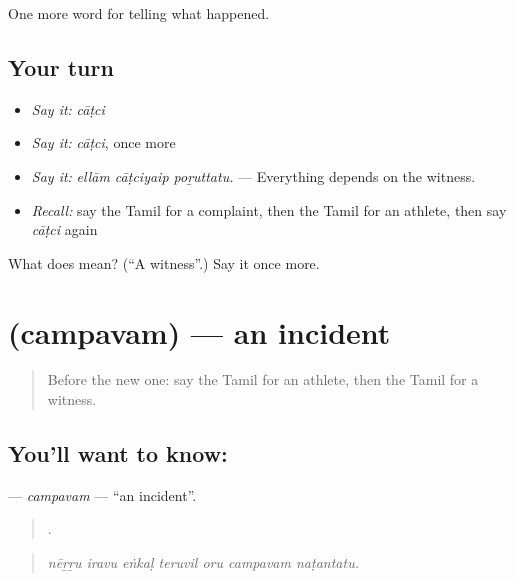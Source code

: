 \begin{grammarlens}[title={What you've built}]
One more word for telling what happened.
\end{grammarlens}

\subsection*{Your turn}
\begin{itemize}
\raggedright
  \item \emph{Say it:} \emph{cāṭci}
  \item \emph{Say it:} \emph{cāṭci}, once more
  \item \emph{Say it:} \emph{ellām cāṭciyaip poṟuttatu.} — Everything depends on the witness.
  \item \emph{Recall:} say the Tamil for a complaint, then the Tamil for an athlete, then say \emph{cāṭci} again
\end{itemize}

\begin{tcolorbox}[breakable,colback=teal!4,colframe=teal!35!black,title={Before you move on}]
What does  mean? (\textquotedblleft{}A witness\textquotedblright{}.) Say it once more.
\end{tcolorbox}
\section[\texorpdfstring{\ta{சம்பவம்} (campavam)}{சம்பவம் (campavam)}]{ (campavam) — an incident}

\label{lesson:TA-C294-campavam}



\begin{quote}
Before the new one: say the Tamil for an athlete, then the Tamil for a witness.
\end{quote}

\subsection*{You'll want to know: }
\textbf{} — \emph{campavam} — \textquotedblleft{}an incident\textquotedblright{}.

\begin{quote}
      .
\end{quote}

\begin{quote}
\emph{nēṟṟu iravu eṅkaḷ teruvil oru campavam naṭantatu.}
\end{quote}

